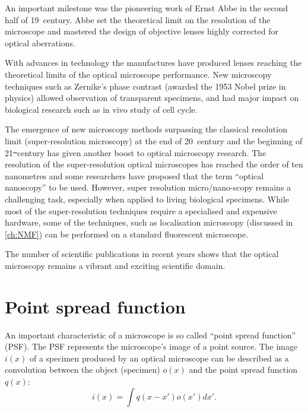 An important milestone was the pioneering work of Ernst Abbe \cite{Abbe1873} in the second half of 19\ths\ century. Abbe set the theoretical limit on the resolution of the microscope and mastered the design of objective lenses highly corrected for optical aberrations.

With advances in technology the manufactures have produced lenses reaching the theoretical limits of the optical microscope performance. New microscopy techniques such as Zernike's phase contrast \cite{Zernike1942} (awarded the 1953 Nobel prize in physics) allowed observation of transparent specimens, and had major impact on biological research such as in vivo study of cell cycle. 

The emergence of new microscopy methods surpassing the classical resolution limit (super-resolution microscopy) at the end of 20\ths\ century and the beginning of 21\st\ century has given another boost to optical microscopy research. The resolution of the super-resolution optical microscopes has reached the order of ten nanometres and some researchers have proposed that the term ``optical nanoscopy'' to be used. However, super resolution micro/nano-scopy remains a challenging task, especially when applied to living biological specimens. While most of the super-resolution techniques require a specialised and expensive hardware, some of the techniques, such as localisation microscopy (discussed in \autoref{ch:NMF}) can be performed on a standard fluorescent microscope. 

The number of scientific publications in recent years shows that the optical microscopy remains a vibrant and exciting scientific domain.


\section{Point spread function}

An important characteristic of a microscope is so called ``point spread function'' (PSF). The PSF represents the microscope's image of a point source. The image $i(x)$ of a specimen produced by an optical microscope can be described as a convolution between the object (specimen) $o(x)$ and the point spread function $q(x)$:
%
\begin{equation}
	i(x)=\int q(x-x')o(x')dx'.
	\label{eq:conv}
\end{equation}  

